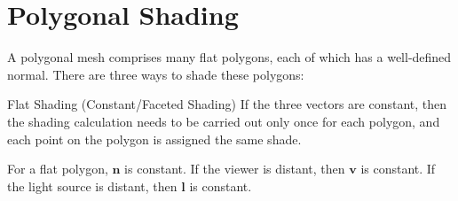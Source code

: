 \documentclass[../COS3712_Notes.tex]{subfiles}
\begin{document}
    \section{Polygonal Shading}
      A polygonal mesh comprises many flat polygons, each of which has a well-defined normal.
      There are three ways to shade these polygons:
      \begin{descriptimize}
        \item[Flat Shading (Constant/Faceted Shading)] If the three vectors are constant,
          then the shading calculation needs to be carried out only once for each polygon,
          and each point on the polygon is assigned the same shade.

          For a flat polygon, $\mathbf{n}$ is constant.
          If the viewer is distant, then $\mathbf{v}$ is constant.
          If the light source is distant, then $\mathbf{l}$ is constant.


\end{descriptimize}
\end{document}
